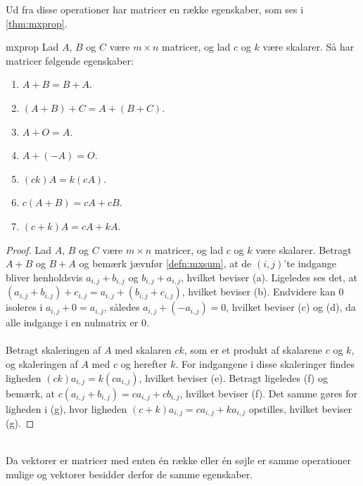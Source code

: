 %
Ud fra disse operationer har matricer en række egenskaber, som ses i \ref{thm:mxprop}.
\begin{thm}{}{mxprop}
Lad $A$, $B$ og $C$ være $m \times n$ matricer, og lad $c$ og $k$ være skalarer.
Så har matricer følgende egenskaber:
\begin{enumerate}[label=(\alph*)]
\item $A + B = B + A$.
\item $(A + B) + C = A + (B + C)$.
\item $A + O = A$.
\item $A + (-A) = O$.
\item $(ck)A = k(cA)$.
\item $c(A + B) = cA + cB$.
\item $(c + k)A = cA + kA$.
\end{enumerate}
\end{thm}
%
\begin{proof} %
Lad $A$, $B$ og $C$ være $m \times n$ matricer, og lad $c$ og $k$ være skalarer.
Betragt $A + B$ og $B + A$ og bemærk jævnfør \ref{defn:mxsum}, at de $(i,j)$'te indgange bliver henholdsvis $a_{i,j} + b_{i,j}$ og $b_{i,j} + a_{i,j}$, hvilket beviser (a).
Ligeledes ses det, at $(a_{i,j} + b_{i,j}) + c_{i,j} = a_{i,j} + (b_{i,j} + c_{i,j})$, hvilket beviser (b).
Endvidere kan $0$ isoleres i $a_{i,j} + 0 = a_{i,j}$, således $a_{i,j} + (-a_{i,j}) = 0$, hvilket beviser (c) og (d), da alle indgange i en nulmatrix er $0$.
\\\\
%
Betragt skaleringen af $A$ med skalaren $ck$, som er et produkt af skalarene $c$ og $k$, og skaleringen af $A$ med $c$ og herefter $k$.
For indgangene i disse skaleringer findes ligheden $(ck)a_{i,j} = k(ca_{i,j})$, hvilket beviser (e).
Betragt ligeledes (f) og bemærk, at $c(a_{i,j} + b_{i,j}) = ca_{i,j} + cb_{i,j}$, hvilket beviser (f).
Det samme gøres for ligheden i (g), hvor ligheden $(c + k)a_{i,j} = ca_{i,j} + ka_{i,j}$ opstilles, hvilket beviser (g).
\end{proof}
\noindent
\\
%
Da vektorer er matricer med enten én række eller én søjle er samme operationer mulige og vektorer besidder derfor de samme egenskaber.
%
\\\\
\phantom{Hejmeddig}
\\\\